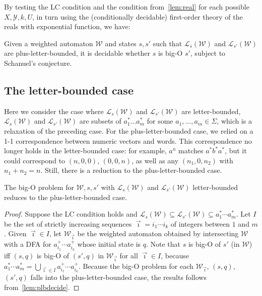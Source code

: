 \documentclass{lmcs}
\theoremstyle{plain}
\theoremstyle{definition}
\theoremstyle{remark}
\newcommand\lng[2]{\mathcal{L}_{#1}(#2)}
\newcommand\wa{\mathcal{W}}
\begin{document}
By testing the LC condition and the condition from~\cref{lem:real}  for each possible $X,\mathcal{Y}, k,U$, in turn using the (conditionally decidable) first-order theory of the reals with exponential function, we have:
\begin{lem}\label{lem:plbdecide}
Given a weighted automaton $\wa$ and states $s,s'$ such that $\lng{s}{\wa}$ and $\lng{s'}{\wa}$ are  plus-letter-bounded, it is decidable whether $s$ is big-O $s'$, subject to Schanuel's conjecture.
\end{lem}

\subsection{The letter-bounded case}\label{sec:letterboundedcase}

Here we consider the case where $\lng{s}{\wa}$ and $\lng{s'}{\wa}$ are letter-bounded,
$\lng{s}{\wa}$ and $\lng{s'}{\wa}$ are subsets of $a_1^*\dots a_m^*$ for some $a_1,\dots,a_m\in\Sigma$,
which is a relaxation of the preceding case.
For the plus-letter-bounded case, we relied on a 1-1 correspondence between numeric vectors and words.
This correspondence no longer holds in the letter-bounded case: for example, $a^n$ matches  $a^* b^* a^*$, but it could correspond to $(n,0,0)$, $(0,0,n)$, as well as any $(n_1,0,n_2)$ with $n_1+n_2=n$.
Still, there is a reduction to the plus-letter-bounded case.

\begin{lem}\label{lem:lbtoplb}
The big-O problem for $\wa, s, s'$ with $\lng{s}{\wa}$ and $\lng{s'}{\wa}$ letter-bounded reduces to the plus-letter-bounded case.
\end{lem}

\begin{proof}
Suppose the LC condition holds and  $\lng{s}{\wa}\subseteq \lng{s'}{\wa} \subseteq a_1^\ast\cdots a_m^\ast$.
Let $I$ be the set of strictly increasing sequences $\vec{\imath} = i_1\cdots i_k$ of integers between $1$ and $m$.
Given $ \vec{\imath}\in I$, let $\wa_{\vec{\imath}}$ be the weighted automaton obtained by intersecting $\wa$ with a DFA for $a_{i_1}^+\cdots a_{i_k}^+$ whose initial state is $q$.
Note that $s$ is big-O of $s'$ (in $\wa$) iff $(s,q)$ is big-O of $(s',q)$ in $\wa_{\vec{\imath}}$ for all $\vec{\imath}\in I$, because $a_1^\ast\cdots a_m^\ast = \bigcup_{\vec{\imath}\in I} a_{i_1}^+\cdots a_{i_k}^+$.
Because the big-O problem for each $\wa_{\vec{\imath}}$, $(s,q)$, $(s',q)$ falls into the plus-letter-bounded case, the results follows from~\cref{lem:plbdecide}.
\end{proof}
\end{document}
